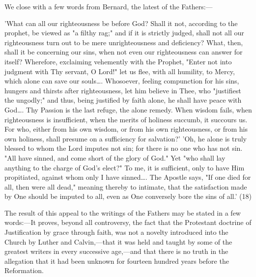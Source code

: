 \documentclass[
]{book}
\begin{document}
We close with a few words from Bernard, the latest of the Fathers:---

'What can all our righteousness be before God? Shall it not, according to the prophet, be viewed as "a filthy rag;" and if it is strictly judged, shall not all our righteousness turn out to be mere unrighteousness and deficiency? What, then, shall it be concerning our sins, when not even our righteousness can answer for itself? Wherefore, exclaiming vehemently with the Prophet, "Enter not into judgment with Thy servant, O Lord!" let us flee, with all humility, to Mercy, which alone can save our souls\ldots. Whosoever, feeling compunction for his sins, hungers and thirsts after righteousness, let him believe in Thee, who "justifiest the ungodly;" and thus, being justified by faith alone, he shall have peace with God\ldots. Thy Passion is the last refuge, the alone remedy. When wisdom fails, when righteousness is insufficient, when the merits of holiness succumb, it succours us. For who, either from his own wisdom, or from his own righteousness, or from his own holiness, shall presume on a sufficiency for salvation?' 'Oh, he alone is truly blessed to whom the Lord imputes not sin; for there is no one who has not sin. "All have sinned, and come short of the glory of God." Yet "who shall lay anything to the charge of God's elect?" To me, it is sufficient, only to have Him propitiated, against whom only I have sinned\ldots. The Apostle says, "If one died for all, then were all dead," meaning thereby to intimate, that the satisfaction made by One should be imputed to all, even as One conversely bore the sins of all.' (18)

The result of this appeal to the writings of the Fathers may be stated in a few words:---It proves, beyond all controversy, the fact that the Protestant doctrine of Justification by grace through faith, was not a novelty introduced into the Church by Luther and Calvin,---that it was held and taught by some of the greatest writers in every successive age,---and that there is no truth in the allegation that it had been unknown for fourteen hundred years before the Reformation.
\end{document}
